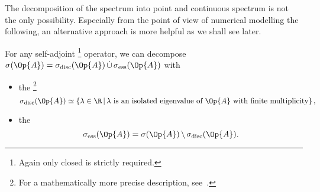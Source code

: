The decomposition of the spectrum into point and continuous spectrum
is not the only possibility.
Especially from the point of view of numerical modelling
the following, an alternative approach is more helpful
as we shall see later.

\begin{defn}
	For any self-adjoint%
	\footnote{Again only closed is strictly required.}
	operator,
	we can decompose \linebreak
	$\sigma(\Op{A}) = \sigma_\text{disc}(\Op{A}) \, \dot{\cup} \, \sigma_\text{ess}(\Op{A})$
	with
	\begin{itemize}
		\item the %
			\footnote{For a mathematically more precise description, see~\cite[p.~103 and p.~132]{Helffer2013}.}
			\[ \sigma_\text{disc}(\Op{A}) \simeq \left\{ \lambda \in \R \, \middle|
			\, \text{$\lambda$ is an isolated eigenvalue of $\Op{A}$
			with finite multiplicity} \right\}, \]
		\item the 
			\[\sigma_\text{ess}(\Op{A}) 
			= \sigma(\Op{A}) \, \backslash \, \sigma_\text{disc}(\Op{A}). \]
	\end{itemize}
\end{defn}

